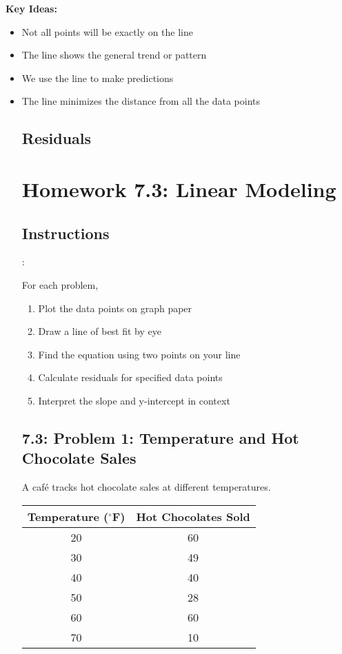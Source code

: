 \documentclass[12pt]{article}
\begin{document}
			\textbf{Key Ideas:}
			\begin{itemize}
				\item Not all points will be exactly on the line
				\item The line shows the general trend or pattern
				\item We use the line to make predictions
				\item The line minimizes the distance from all the data points


		\subsection*{Residuals}

	\section*{Homework 7.3: Linear Modeling}

		\subsection*{Instructions}:
			
			For each problem,
			\begin{enumerate}
				\item Plot the data points on graph paper
				\item Draw a line of best fit by eye
				\item Find the equation using two points on your line
				\item Calculate residuals for specified data points
				\item Interpret the slope and y-intercept in context
			\end{enumerate}

			\newpage

		\subsection*{7.3: Problem 1: Temperature and Hot Chocolate Sales}

			A café tracks hot chocolate sales at different temperatures.

			\begin{center}
				\begin{tabular}{|c|c|}
					\hline
					Temperature ($^\circ$F) & Hot Chocolates Sold \\
					\hline
					20 & 60 \\
					30 & 49 \\
					40 & 40 \\
					50 & 28 \\
					60 & 60 \\
					70 & 10 \\
					\hline
				\end{tabular}
			\end{center}


\end{itemize}
\end{document}
